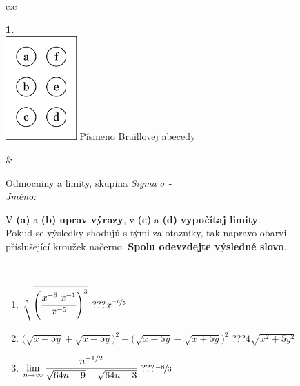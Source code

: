 \documentclass[10pt]{report}
\begin{document}
\begin{tabular}{c:c}
\begin{minipage}[c][104.5mm][t]{0.5\linewidth}
\begin{center}
\begin{minipage}{0.20\linewidth}
\begin{center}
{\Huge\bfseries 1.} \\[2mm]
\includegraphics[height=40mm]{../images/braille.png}
{\small Písmeno Braillovej abecedy}
\end{center}
\end{minipage}
\end{center}
\end{minipage}
&
\begin{minipage}[c][104.5mm][t]{0.5\linewidth}
\begin{center}
\vspace{7mm}
{\huge Odmocniny a limity, skupina \textit{Sigma $\sigma$} -}\\[5mm]
\textit{Jméno:}\phantom{xxxxxxxxxxxxxxxxxxxxxxxxxxxxxxxxxxxxxxxxxxxxxxxxxxxxxxxxxxxxxxxxx}\\[5mm]
\begin{minipage}{0.95\linewidth}
\begin{center}
V \textbf{(a)} a \textbf{(b)} \textbf{uprav výrazy}, v \textbf{(c)} a \textbf{(d)} \textbf{vypočítaj limity}.\\Pokud se výsledky shodujú s tými za otazníky, tak napravo obarvi\\příslušející kroužek načerno. \textbf{Spolu odevzdejte výsledné slovo}.
\end{center}
\end{minipage}
\\[1mm]
\begin{minipage}{0.79\linewidth}
\begin{center}
\begin{varwidth}{\linewidth}
\begin{enumerate}
\small
\item $\sqrt[5]{\left(\cfrac{x^{-6}\;x^{-1}}{x^{-5}}\right)^{3}}$\quad \dotfill\; ???\;\dotfill \quad $x^{\nicefrac{-6}{5}}$
\item {\footnotesize{\scriptsize$\big(\sqrt{x-5y}+\sqrt{x+5y}\big)^2-\big(\sqrt{x-5y}-\sqrt{x+5y}\big)^2$}\quad \dotfill\; ???\;\dotfill \quad $4\sqrt{x^2+5y^2}$}
\item $\lim\limits_{n\to\infty}\cfrac{n^{-1/2}}{\sqrt{64n-9}-\sqrt{64n-3}}$\quad \dotfill\; ???\;\dotfill \quad $\nicefrac{-8}{3}$

\end{enumerate}
\end{varwidth}
\end{center}
\end{minipage}
\end{center}
\end{minipage}
\end{tabular}
\end{document}

